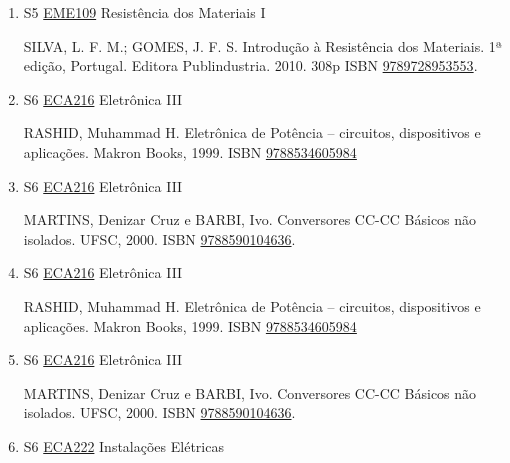 \documentclass[12pt,a4paper]{book}
\begin{document}
\begin{enumerate}
 JOHNSTON JR. , E.  R.;  BEER, F.  P.;  Mecânica dos Materiais.  5ª edição.  São Paulo.  Editora MCGRAW HILL - ARTMED.  2011.  800p.  ISBN \href{http://www.bn.br/site/pages/servicosProfissionais/agenciaISBN/isbnBusca/FbnBuscaISBNCatalogo.asp?pField=ISBN&pIntPagina=1&pISBN=63308238&nidbISBN=true&hidbISBN=true}{9788563308238}. 
 
 
 \item S5 \hyperref[PUD:EME109]{EME109} Resistência dos Materiais I

 SILVA, L.  F.  M.;  GOMES, J.  F.  S.  Introdução à Resistência dos Materiais. 1ª edição, Portugal.  Editora Publindustria.  2010.  308p  ISBN \href{http://www.google.com/search?hl=pt-BR&tbo=p&tbm=bks&q=isbn:9789728953553&num=10}{9789728953553}.
 \item S6 \hyperref[PUD:ECA216]{ECA216} Eletrônica III

 RASHID, Muhammad H.  Eletrônica de Potência – circuitos, dispositivos e aplicações.  Makron Books, 1999.  ISBN \href{http://www.bn.br/site/pages/servicosProfissionais/agenciaISBN/isbnBusca/FbnBuscaISBNCatalogo.asp?pField=ISBN&pIntPagina=1&pISBN=34605984&nidbISBN=true&hidbISBN=true}{9788534605984}
 
 
 \item S6 \hyperref[PUD:ECA216]{ECA216} Eletrônica III

 MARTINS, Denizar Cruz e BARBI, Ivo.  Conversores CC-CC Básicos não isolados.  UFSC, 2000.  ISBN \href{http://www.bn.br/site/pages/servicosProfissionais/agenciaISBN/isbnBusca/FbnBuscaISBNCatalogo.asp?pField=ISBN&pIntPagina=1&pISBN=90104636&nidbISBN=true&hidbISBN=true}{9788590104636}.
 \item S6 \hyperref[PUD:ECA216]{ECA216} Eletrônica III

 RASHID, Muhammad H.  Eletrônica de Potência – circuitos, dispositivos e aplicações.  Makron Books, 1999.  ISBN \href{http://www.bn.br/site/pages/servicosProfissionais/agenciaISBN/isbnBusca/FbnBuscaISBNCatalogo.asp?pField=ISBN&pIntPagina=1&pISBN=34605984&nidbISBN=true&hidbISBN=true}{9788534605984}
 
 
 \item S6 \hyperref[PUD:ECA216]{ECA216} Eletrônica III

 MARTINS, Denizar Cruz e BARBI, Ivo.  Conversores CC-CC Básicos não isolados.  UFSC, 2000.  ISBN \href{http://www.bn.br/site/pages/servicosProfissionais/agenciaISBN/isbnBusca/FbnBuscaISBNCatalogo.asp?pField=ISBN&pIntPagina=1&pISBN=90104636&nidbISBN=true&hidbISBN=true}{9788590104636}.
 \item S6 \hyperref[PUD:ECA222]{ECA222} Instalações Elétricas


\end{enumerate}
\end{document}

